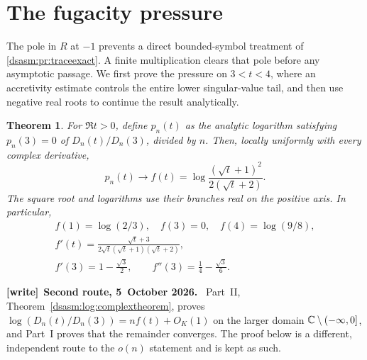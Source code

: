 \documentclass[11pt,letterpaper]{article}
\newtheorem{theorem}{Theorem}[section]
\theoremstyle{remark}\newtheorem{remark}[theorem]{Remark}
\newenvironment{writenote}[1][]{\par\smallskip\begingroup\small
 \noindent\textbf{[write]}\if\relax\detokenize{#1}\relax\else~\textbf{#1.}\fi\ }%
 {\par\endgroup\smallskip}
\begin{document}
\section{The fugacity pressure}
\label{dsasm:pr:sec:pressure}
The pole in $R$ at $-1$ prevents a direct bounded-symbol treatment of
\eqref{dsasm:pr:traceexact}. A finite multiplication clears that pole before
any asymptotic passage. We first prove the pressure on $3<t<4$, where
an accretivity estimate controls the entire lower singular-value tail,
and then use negative real roots to continue the result analytically.

\begin{theorem}\label{dsasm:pr:pressuretheorem}
For $\Re t>0$, define $p_n(t)$ as the analytic logarithm satisfying
$p_n(3)=0$ of $D_n(t)/D_n(3)$, divided by $n$. Then, locally uniformly
with every complex derivative,
\begin{equation}\label{dsasm:pr:pressurelimit}
 p_n(t)\longrightarrow
 f(t)=\log\frac{(\sqrt t+1)^2}{2(\sqrt t+2)}.
\end{equation}
The square root and logarithms use their branches real on the positive
axis. In particular,
\begin{equation}\label{dsasm:pr:pressurevalues}
\begin{gathered}
 f(1)=\log(2/3),\quad f(3)=0,\quad f(4)=\log(9/8),\\
 f'(t)=\frac{\sqrt t+3}{2\sqrt t(\sqrt t+1)(\sqrt t+2)},\\
 f'(3)=1-\frac{\sqrt3}{2},\qquad f''(3)=\frac14-\frac{\sqrt3}{6}.
\end{gathered}
\end{equation}
\end{theorem}
\begin{writenote}[Second route, 5~October 2026]
Part~II, Theorem~\ref{dsasm:log:complextheorem}, proves $\log(D_n(t)/D_n(3))=nf(t)+O_K(1)$ on the larger domain $\mathbb C\setminus(-\infty,0]$, and Part~I proves that the remainder converges. The proof below is a different, independent route to the $o(n)$ statement and is kept as such.
\end{writenote}
\end{document}
